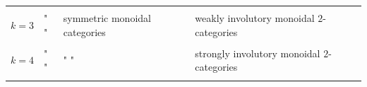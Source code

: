 \documentclass{article}
\begin{document}
\begin{longtable}[]{@{}llll@{}}
\begin{minipage}[t]{0.21\columnwidth}
\strut
\end{minipage}\tabularnewline
\begin{minipage}[t]{0.26\columnwidth}\raggedright
\(k=3\)\strut
\end{minipage} & \begin{minipage}[t]{0.21\columnwidth}\raggedright
" "\strut
\end{minipage} & \begin{minipage}[t]{0.21\columnwidth}\raggedright
symmetric monoidal categories\strut
\end{minipage} & \begin{minipage}[t]{0.21\columnwidth}\raggedright
weakly involutory monoidal \(2\)-categories\strut
\end{minipage}\tabularnewline
\begin{minipage}[t]{0.26\columnwidth}\raggedright
\strut
\end{minipage} & \begin{minipage}[t]{0.21\columnwidth}\raggedright
\strut
\end{minipage} & \begin{minipage}[t]{0.21\columnwidth}\raggedright
\strut
\end{minipage} & \begin{minipage}[t]{0.21\columnwidth}\raggedright
\strut
\end{minipage}\tabularnewline
\begin{minipage}[t]{0.26\columnwidth}\raggedright
\(k=4\)\strut
\end{minipage} & \begin{minipage}[t]{0.21\columnwidth}\raggedright
" "\strut
\end{minipage} & \begin{minipage}[t]{0.21\columnwidth}\raggedright
" "\strut
\end{minipage} & \begin{minipage}[t]{0.21\columnwidth}\raggedright
strongly involutory monoidal \(2\)-categories\strut
\end{minipage}\tabularnewline
\begin{minipage}[t]{0.26\columnwidth}\raggedright
\strut
\end{minipage} & \begin{minipage}[t]{0.21\columnwidth}\raggedright
\strut
\end{minipage} & \begin{minipage}[t]{0.21\columnwidth}\raggedright
\strut
\end{minipage} & \begin{minipage}[t]{0.21\columnwidth}\raggedright

\end{minipage}
\end{longtable}
\end{document}
